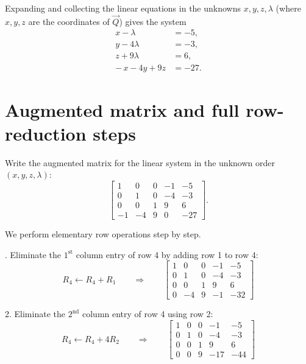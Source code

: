 \documentclass[journal]{IEEEtran}
\begin{document}
Expanding and collecting the linear equations in the unknowns \(x,y,z,\lambda\) (where \(x,y,z\) are the coordinates of \(\vec{Q}\)) gives the system
\begin{align}
x-\lambda &= -5, \label{eq:1}\\
y-4\lambda &= -3, \label{eq:2}\\
z+9\lambda &= 6, \label{eq:3}\\
-\,x-4y+9z &= -27. \label{eq:4}
\end{align}

\section*{Augmented matrix and full row-reduction steps}
Write the augmented matrix for the linear system in the unknown order \((x,y,z,\lambda)\):
\begin{equation}\label{eq:aug0}
\left[\begin{array}{cccc|c}
1 & 0 & 0 & -1 & -5\\[4pt]
0 & 1 & 0 & -4 & -3\\[4pt]
0 & 0 & 1 & 9  & 6 \\[4pt]
-1& -4& 9 & 0  & -27
\end{array}\right].
\end{equation}

We perform elementary row operations step by step.

. Eliminate the \(1^{\text{st}}\) column entry of row 4 by adding row 1 to row 4:
\begin{equation}\label{eq:step1}
R_4 \leftarrow R_4+R_1
\qquad\Longrightarrow\qquad
\left[\begin{array}{cccc|c}
1 & 0 & 0 & -1 & -5\\[4pt]
0 & 1 & 0 & -4 & -3\\[4pt]
0 & 0 & 1 & 9  & 6 \\[4pt]
0 & -4& 9 & -1 & -32
\end{array}\right]
\end{equation}

2. Eliminate the \(2^{\text{nd}}\) column entry of row 4 using row 2:
\begin{equation}\label{eq:step2}
R_4 \leftarrow R_4 + 4R_2
\qquad\Longrightarrow\qquad
\left[\begin{array}{cccc|c}
1 & 0 & 0 & -1 & -5\\[4pt]
0 & 1 & 0 & -4 & -3\\[4pt]
0 & 0 & 1 & 9  & 6 \\[4pt]
0 & 0 & 9 & -17 & -44
\end{array}\right]
\end{equation}
\end{document}
